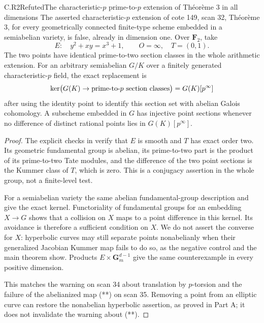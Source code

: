 \begin{claim}{C.R2}{Refuted}{The characteristic-$p$ prime-to-$p$ extension of Théorème 3 in all dimensions}
The asserted characteristic-$p$ extension of cote 149, scan 32,
Théorème 3, for every geometrically connected finite-type scheme
embedded in a semiabelian variety, is false, already in dimension
one. Over $\mathbf F_2$, take
\[
 E:\quad y^2+xy=x^3+1,\qquad O=\infty,\quad T=(0,1).
\]
The two points have identical prime-to-two section classes in
the whole arithmetic extension. For an arbitrary semiabelian
$G/K$ over a finitely generated characteristic-$p$ field, the
exact replacement is
\[
 \ker\bigl(G(K)\to\hbox{prime-to-}p\hbox{ section classes}\bigr)
       =G(K)[p^\infty]
\]
after using the identity point to identify this section set with
abelian Galois cohomology. A subscheme embedded in $G$ has
injective point sections whenever no difference of distinct
rational points lies in $G(K)[p^\infty]$.
\end{claim}
\begin{proof}
The explicit checks in  verify that $E$ is
smooth and $T$ has exact order two. Its geometric fundamental
group is abelian, its prime-to-two part is the product of its
prime-to-two Tate modules, and the difference of the two point
sections is the Kummer class of $T$, which is zero. This is a
conjugacy assertion in the whole group, not a finite-level test.

For a semiabelian variety the same abelian fundamental-group
description and  give the exact kernel.
Functoriality of fundamental groups for an embedding $X\to G$
shows that a collision on $X$ maps to a point difference in this
kernel. Its avoidance is therefore a sufficient condition on
$X$. We do not assert the converse for $X$: hyperbolic curves
may still separate points nonabelianly when their generalized
Jacobian Kummer map fails to do so, as the negative control
 and the main theorem show. Products
$E\times\mathbf G_m^{d-1}$ give the same counterexample in every
positive dimension.

This matches the warning on scan 34 about translation by
$p$-torsion and the failure of the abelianized map (**) on scan
35. Removing a point from an elliptic curve can restore the
nonabelian hyperbolic assertion, as proved in Part A; it does
not invalidate the warning about (**).
\end{proof}

